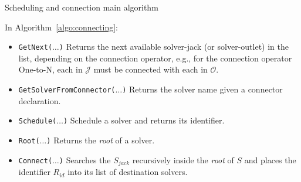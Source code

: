 
\incmargin{1.4em}
\linesnumbered
\begin{algorithm}[H]
\dontprintsemicolon
\SetLine
{}

{}
\caption{Scheduling and connection main algorithm}\label{algo:connecting}
\end{algorithm}

In Algorithm~\ref{algo:connecting}:
\begin{itemize}
\item \texttt{GetNext($\dots$)} Returns the next available solver-jack (or solver-outlet) in the list, depending on the connection operator, e.g., for the connection operator One-to-N, each \jack{} in $\mathcal{J}$ must be connected with each \outlet{} in $\mathcal{O}$.
\item \texttt{GetSolverFromConnector($\dots$)} Returns the solver name given a connector declaration.
\item \texttt{Schedule($\dots$)} Schedule a solver and returns its identifier.
\item \texttt{Root($\dots$)} Returns the {\it root} \cm{} of a solver.
\item \texttt{Connect($\dots$)} %
Searches the \om{} $S_{jack}$ recursively inside the {\it root} \cm{} of $S$ and places the identifier $R_{id}$ into its list of destination solvers.
\end{itemize}

